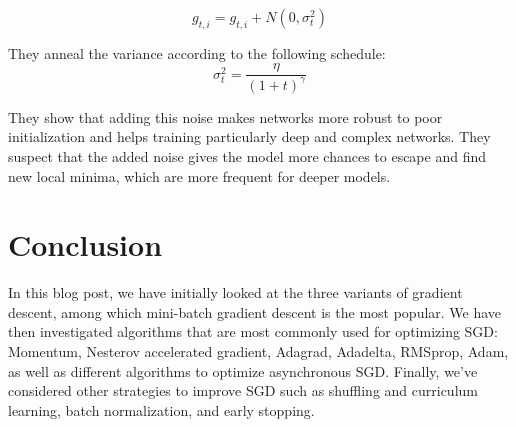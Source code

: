 \documentclass{article}
\begin{document}
\begin{equation}
g_{t, i} = g_{t, i} + N(0, \sigma^2_t)
\end{equation}

They anneal the variance according to the following schedule:
\begin{equation}
\sigma^2_t = \frac{\eta}{(1 + t)^\gamma}
\end{equation}

They show that adding this noise makes networks more robust to poor initialization and helps training particularly deep and complex networks. They suspect that the added noise gives the model more chances to escape and find new local minima, which are more frequent for deeper models.

\section{Conclusion}

In this blog post, we have initially looked at the three variants of gradient descent, among which mini-batch gradient descent is the most popular. We have then investigated algorithms that are most commonly used for optimizing SGD: Momentum, Nesterov accelerated gradient, Adagrad, Adadelta, RMSprop, Adam, as well as different algorithms to optimize asynchronous SGD. Finally, we've considered other strategies to improve SGD such as shuffling and curriculum learning, batch normalization, and early stopping.



\end{document}
